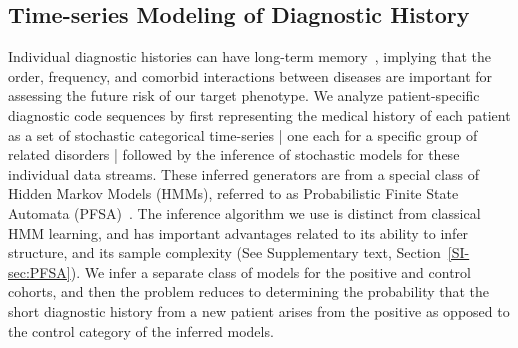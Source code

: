 \documentclass[3p,super,numbers,sort&compress,preprint,10pt]{elsarticle}
\gdef\treatment{positive\xspace}
\begin{document}
\subsection{Time-series Modeling of  Diagnostic History}
Individual diagnostic histories  can have long-term memory~\cite{ltgranger80}, implying that the order, frequency, and comorbid interactions between diseases are   important for assessing the future risk of our target phenotype. 
We analyze  patient-specific  diagnostic code sequences by first  representing the medical history of each patient as a set of stochastic categorical time-series | one each for a specific group of related disorders |  followed by the inference of stochastic models  for  these individual data streams. These inferred generators are from a special class of  Hidden Markov Models (HMMs), referred to as Probabilistic Finite State Automata (PFSA)~\cite{CL12g}. The inference algorithm we use is distinct from classical HMM learning, and has important advantages related to its ability to infer structure, and its sample complexity (See Supplementary text, Section~\ref{SI-sec:PFSA}). We infer a separate class of models for the \treatment and control cohorts, and then the problem reduces to determining the probability that the short diagnostic history from a  new  patient arises from the \treatment as opposed to the control category of the inferred models. 
\end{document}
